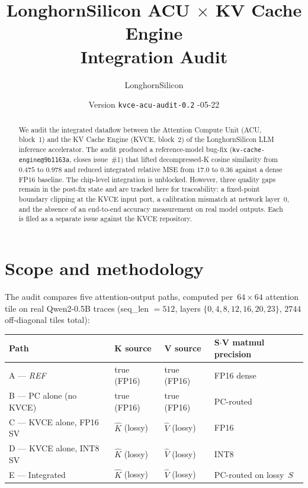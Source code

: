 \documentclass[11pt]{article}
\title{\textbf{LonghornSilicon ACU $\times$ KV Cache Engine \\
       Integration Audit}}
\author{LonghornSilicon}
\date{Version \texttt{kvce-acu-audit-0.2} \quad 2026-05-22}
\begin{document}
\maketitle
\thispagestyle{fancy}

\begin{abstract}
\noindent
We audit the integrated dataflow between the Attention Compute Unit
(ACU, block~1) and the KV Cache Engine (KVCE, block~2) of the
LonghornSilicon LLM inference accelerator. The audit produced a
reference-model bug-fix (\texttt{kv-cache-engine@9b1163a}, closes
issue~\#1) that lifted decompressed-K cosine similarity from
$0.475$ to $0.978$ and reduced integrated relative MSE from $17.0$
to $0.36$ against a dense FP16 baseline. The chip-level integration
is unblocked. However, three quality gaps remain in the post-fix
state and are tracked here for traceability: a fixed-point boundary
clipping at the KVCE input port, a calibration mismatch at network
layer~0, and the absence of an end-to-end accuracy measurement on
real model outputs. Each is filed as a separate issue against the
KVCE repository.
\end{abstract}

\section{Scope and methodology}
\label{sec:scope}

The audit compares five attention-output paths, computed per~$64\!\times\!64$
attention tile on real Qwen2-0.5B traces (seq\_len $=512$, layers
$\{0,4,8,12,16,20,23\}$, $2744$ off-diagonal tiles total):

\begin{center}
\renewcommand{\arraystretch}{1.15}
\begin{tabular}{@{}llll@{}}
\toprule
\textbf{Path} & \textbf{K source} & \textbf{V source} & \textbf{S$\cdot$V matmul precision} \\
\midrule
A --- \textit{REF}              & true (FP16) & true (FP16) & FP16 dense \\
B --- PC alone (no KVCE)        & true (FP16) & true (FP16) & PC-routed \\
C --- KVCE alone, FP16 SV       & $\hat K$ (lossy) & $\hat V$ (lossy) & FP16 \\
D --- KVCE alone, INT8 SV       & $\hat K$ (lossy) & $\hat V$ (lossy) & INT8 \\
E --- Integrated                & $\hat K$ (lossy) & $\hat V$ (lossy) & PC-routed on lossy~$S$ \\
\bottomrule
\end{tabular}
\end{center}
\end{document}
